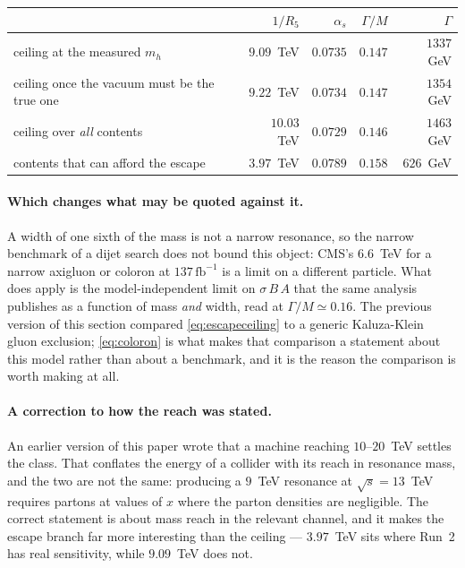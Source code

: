 \documentclass[11pt,a4paper]{article}
\begin{document}
\begin{center}\small
{}
\begin{tabular}{lrrrr}
\toprule
\rowcolor{hdrblue!10} & $1/R_5$ & $\alpha_s$ & $\Gamma/M$ & $\Gamma$\\
\midrule
\rowcolor{amber!14}ceiling at the measured $m_h$ & $9.09$~TeV & $0.0735$ & $0.147$ & $1337$~GeV\\
ceiling once the vacuum must be the true one & $9.22$~TeV & $0.0734$ & $0.147$ & $1354$~GeV\\
ceiling over \emph{all} contents & $10.03$~TeV & $0.0729$ & $0.146$ & $1463$~GeV\\
contents that can afford the escape & $3.97$~TeV & $0.0789$ & $0.158$ & $626$~GeV\\
\bottomrule
\end{tabular}
\end{center}

\paragraph{Which changes what may be quoted against it.} A width of one sixth of the mass is not a
narrow resonance, so the narrow benchmark of a dijet search does not bound this object: CMS's
$6.6$~TeV for a narrow axigluon or coloron at $137\,\mathrm{fb}^{-1}$ \cite{CMSdijet} is a limit on
a different particle. What does apply is the model-independent limit on $\sigma\,B\,A$ that the
same analysis publishes as a function of mass \emph{and} width, read at $\Gamma/M\simeq0.16$. The
previous version of this section compared \eqref{eq:escapeceiling} to a generic Kaluza-Klein gluon
exclusion; \eqref{eq:coloron} is what makes that comparison a statement about this model rather
than about a benchmark, and it is the reason the comparison is worth making at all.

\paragraph{A correction to how the reach was stated.} An earlier version of this paper wrote that a
machine reaching $10$--$20$~TeV settles the class. That conflates the energy of a collider with its
reach in resonance mass, and the two are not the same: producing a $9$~TeV resonance at
$\sqrt s=13$~TeV requires partons at values of $x$ where the parton densities are negligible. The
correct statement is about mass reach in the relevant channel, and it makes the escape branch far
more interesting than the ceiling --- $3.97$~TeV sits where Run~2 has real sensitivity, while
$9.09$~TeV does not.
\end{document}
